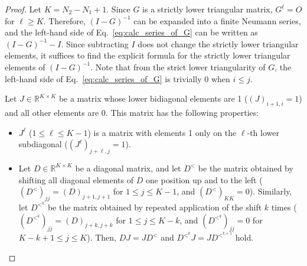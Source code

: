 \documentclass[pdflatex,sn-mathphys-num]{sn-jnl}%
\theoremstyle{thmstyleone}%
\theoremstyle{thmstyletwo}%
\theoremstyle{thmstylethree}%
\begin{document}
\begin{proof}
Let $K = N_{2} - N_{1} + 1$. 
Since $G$ is a strictly lower triangular matrix, $G^{\ell}=O$ for $\ell\ge K$. Therefore, $(I-G)^{-1}$ can be expanded into a finite Neumann series, and the left-hand side of Eq.~\eqref{eq:calc_series_of_G} can be written as $(I-G)^{-1}-I$. Since subtracting $I$ does not change the strictly lower triangular elements, it suffices to find the explicit formula for the strictly lower triangular elements of $(I-G)^{-1}$. Note that from the strict lower triangularity of $G$, the left-hand side of Eq.~\eqref{eq:calc_series_of_G} is trivially 0 when $i\le j$.

Let $J\in\mathbb{R}^{K\times K}$ be a matrix whose lower bidiagonal elements are 1 ($(J)_{i+1,i}=1$) and all other elements are 0. This matrix has the following properties:
\begin{itemize}
\item $J^{\ell}$ ($1\le\ell\le K-1$) is a matrix with elements 1 only on the $\ell$-th lower subdiagonal ($(J^{\ell})_{j+\ell,j}=1$).
\item Let $D\in\mathbb{R}^{K\times K}$ be a diagonal matrix, and let $D^<$ be the matrix obtained by shifting all diagonal elements of $D$ one position up and to the left 
($(D^<)_{jj}=(D)_{j+1,j+1}$ for $1\le j\le K-1$, and $(D^<)_{KK}=0$). 
Similarly, 
let $D^{<^{k}}$ be the matrix obtained by repeated application of the shift $k$ times 
($(D^{<^{k}})_{jj}=(D)_{j+k,j+k}$ for $1\le j\le K-k$, and $(D^{<^{k}})_{jj}=0$ for $K-k+1 \le j\le K$). 
Then, $DJ=JD^<$ and $D^{<^{k}} J = J D^{<^{k+1}}$ hold.
\end{itemize}


\end{proof}
\end{document}
